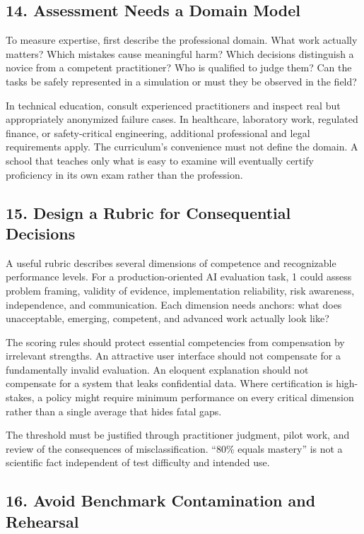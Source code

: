 \subsection*{14. Assessment Needs a Domain Model}

To measure expertise, first describe the professional domain. What work actually matters? Which mistakes cause meaningful harm? Which decisions distinguish a novice from a competent practitioner? Who is qualified to judge them? Can the tasks be safely represented in a simulation or must they be observed in the field?

In technical education, consult experienced practitioners and inspect real but appropriately anonymized failure cases. In healthcare, laboratory work, regulated finance, or safety-critical engineering, additional professional and legal requirements apply. The curriculum's convenience must not define the domain. A school that teaches only what is easy to examine will eventually certify proficiency in its own exam rather than the profession.

\subsection*{15. Design a Rubric for Consequential Decisions}

A useful rubric describes several dimensions of competence and recognizable performance levels. For a production-oriented AI evaluation task, 1 could assess problem framing, validity of evidence, implementation reliability, risk awareness, independence, and communication. Each dimension needs anchors: what does unacceptable, emerging, competent, and advanced work actually look like?

The scoring rules should protect essential competencies from compensation by irrelevant strengths. An attractive user interface should not compensate for a fundamentally invalid evaluation. An eloquent explanation should not compensate for a system that leaks confidential data. Where certification is high-stakes, a policy might require minimum performance on every critical dimension rather than a single average that hides fatal gaps.

The threshold must be justified through practitioner judgment, pilot work, and review of the consequences of misclassification. ``80\% equals mastery'' is not a scientific fact independent of test difficulty and intended use.

\subsection*{16. Avoid Benchmark Contamination and Rehearsal}

